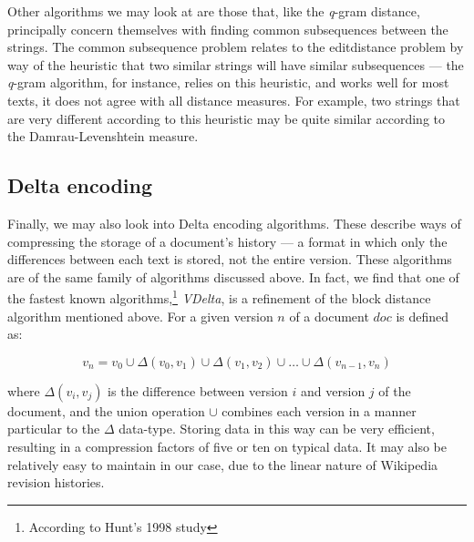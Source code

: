 Other algorithms we may look at are those that, like the
\textit{q}-gram distance, principally concern themselves with finding
common subsequences between the strings. The common subsequence
problem relates to the editdistance problem by way of the
heuristic that two similar strings will have similar subsequences ---
the \textit{q}-gram algorithm, for instance, relies on this heuristic,
and works well for most texts, it does not agree with all distance
measures. For example, two strings that are very different according
to this heuristic may be quite similar according to the
Damrau-Levenshtein measure.


\subsection*{Delta encoding}
Finally, we may also look into Delta encoding algorithms. These
describe ways of compressing the storage of a document's history --- a
format in which only the differences between each text is stored, not
the entire version. These algorithms are of the same family of
algorithms discussed above. In fact, we find that one of the fastest
known algorithms,\footnote{According to Hunt's 1998
  study\cite{Hunt1998}} \textit{VDelta}, is a refinement of the block
distance algorithm mentioned above. For a given version $n$ of a
document $doc$ is defined as:

$$v_n = v_0 \cup {\Delta}(v_0,v_1) \cup {\Delta}(v_1,v_2) \cup \dots
\cup {\Delta}(v_{n-1},v_n) $$

where ${\Delta}(v_i,v_j)$ is the difference between version $i$ and
version $j$ of the document, and the union operation $\cup$ combines
each version in a manner particular to the $\Delta$ data-type. Storing
data in this way can be very efficient, resulting in a compression
factors of five or ten on typical data.\cite{Macdonald2000} It may
also be relatively easy to maintain in our case, due to the linear
nature of Wikipedia revision histories.

